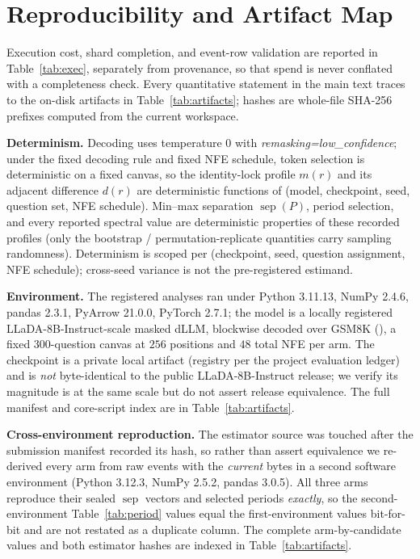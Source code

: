 \documentclass{article}
\begin{document}
\section{Reproducibility and Artifact Map}\label{app:artifacts}

Execution cost, shard completion, and event-row validation are reported in
Table~\ref{tab:exec}, separately from provenance, so that spend is never conflated
with a completeness check. Every quantitative statement in the main text traces to
the on-disk artifacts in Table~\ref{tab:artifacts}; hashes are whole-file SHA-256
prefixes computed from the current workspace.

\textbf{Determinism.} Decoding uses temperature $0$ with
\emph{remasking=low\_confidence}; under the fixed decoding rule and fixed NFE
schedule, token selection is deterministic on a fixed canvas, so the identity-lock
profile $m(r)$ and its adjacent difference $d(r)$ are deterministic functions of
(model, checkpoint, seed, question set, NFE schedule). Min--max separation
$\operatorname{sep}(P)$, period selection, and every reported spectral value are
deterministic properties of these recorded profiles (only the bootstrap /
permutation-replicate quantities carry sampling randomness). Determinism is scoped
per (checkpoint, seed, question assignment, NFE schedule); cross-seed variance is
not the pre-registered estimand.

\textbf{Environment.} The registered analyses ran under Python 3.11.13, NumPy
2.4.6, pandas 2.3.1, PyArrow 21.0.0, PyTorch 2.7.1; the model is a locally
registered LLaDA-8B-Instruct-scale masked dLLM, blockwise decoded over GSM8K
(\citealt{cobbe2021gsm8k}), a fixed $300$-question canvas at $256$ positions and
$48$ total NFE per arm. The checkpoint is a private local artifact (registry per
the project evaluation ledger) and is \emph{not} byte-identical to the public
LLaDA-8B-Instruct release; we verify its magnitude is at the same scale but do not
assert release equivalence. The full manifest and core-script index are in
Table~\ref{tab:artifacts}.

\textbf{Cross-environment reproduction.} The estimator source was touched after
the submission manifest recorded its hash, so rather than assert equivalence we
re-derived every arm from raw events with the \emph{current} bytes in a second software
environment (Python 3.12.3, NumPy 2.5.2, pandas 3.0.5). All three arms reproduce
their sealed $\operatorname{sep}$ vectors and selected periods \emph{exactly}, so
the second-environment Table~\ref{tab:period} values equal the first-environment
values bit-for-bit and are not restated as a duplicate column. The complete
arm-by-candidate values and both estimator hashes are indexed in
Table~\ref{tab:artifacts}.
\end{document}
